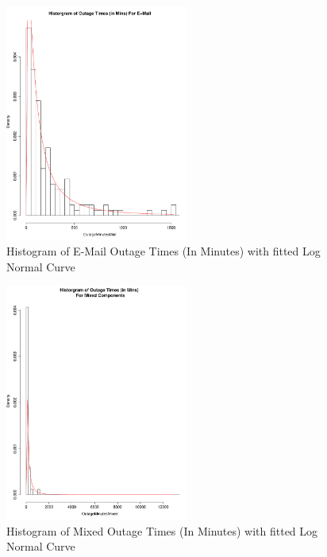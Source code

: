 \documentclass[conference]{IEEEtran}
\begin{document}
\begin{figure}
\begin{center}
\includegraphics[width=6cm]{graph4.pdf} 
\caption{ Histogram of E-Mail  Outage Times (In Minutes) with fitted Log Normal Curve}
\end{center}
\label{fig:outagedistribution}
\end{figure}

\begin{figure}
\begin{center}
\includegraphics[width=6cm]{graph5.pdf} 
\caption{ Histogram of Mixed Outage Times (In Minutes) with fitted Log Normal Curve}
\end{center}
\label{fig:outagedistribution}
\end{figure}
\end{document}
